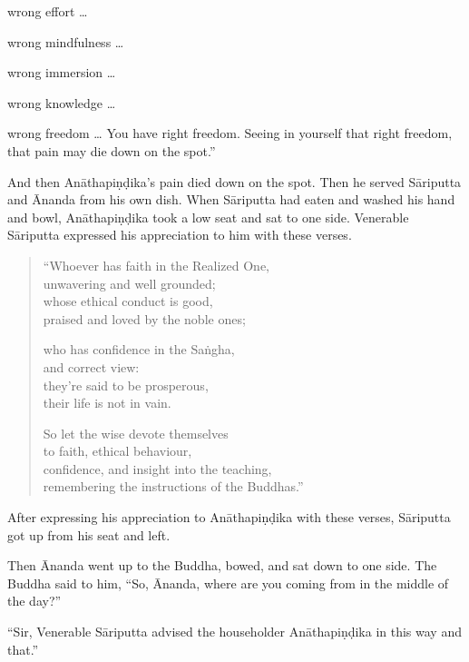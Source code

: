 \documentclass[12pt,openany]{book}%
\begin{document}
wrong effort … 

wrong mindfulness … 

wrong immersion … 

wrong knowledge … 

wrong freedom … You have right freedom. Seeing in yourself that right freedom, that pain may die down on the spot.” 

And then \textsanskrit{Anāthapiṇḍika}’s pain died down on the spot. Then he served \textsanskrit{Sāriputta} and Ānanda from his own dish. When \textsanskrit{Sāriputta} had eaten and washed his hand and bowl, \textsanskrit{Anāthapiṇḍika} took a low seat and sat to one side. Venerable \textsanskrit{Sāriputta} expressed his appreciation to him with these verses. 

\begin{verse}%
“Whoever has faith in the Realized One, \\
unwavering and well grounded; \\
whose ethical conduct is good, \\
praised and loved by the noble ones; 

who has confidence in the \textsanskrit{Saṅgha}, \\
and correct view: \\
they’re said to be prosperous, \\
their life is not in vain. 

So let the wise devote themselves \\
to faith, ethical behaviour, \\
confidence, and insight into the teaching, \\
remembering the instructions of the Buddhas.” 

%
\end{verse}

After expressing his appreciation to \textsanskrit{Anāthapiṇḍika} with these verses, \textsanskrit{Sāriputta} got up from his seat and left. 

Then Ānanda went up to the Buddha, bowed, and sat down to one side. The Buddha said to him, “So, Ānanda, where are you coming from in the middle of the day?” 

“Sir, Venerable \textsanskrit{Sāriputta} advised the householder \textsanskrit{Anāthapiṇḍika} in this way and that.” 
\end{document}
